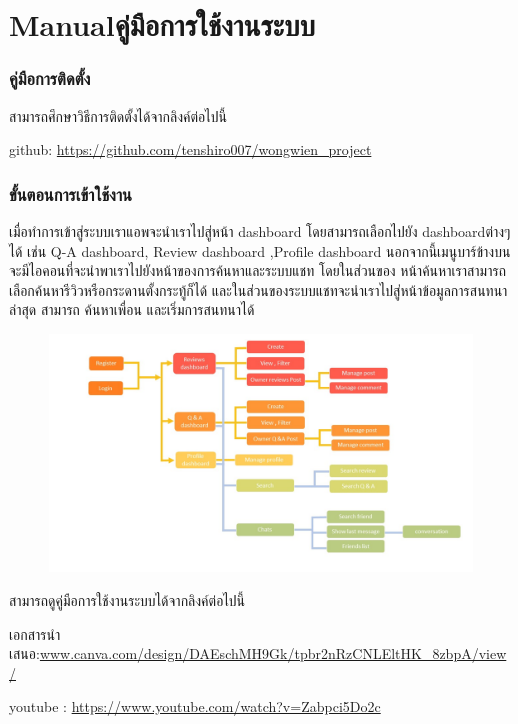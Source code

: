 
\ifenglish\else

\fi

\chapter{\ifenglish Manual\else คู่มือการใช้งานระบบ\fi}

\subsection{คู่มือการติดตั้ง }

สามารถศึกษาวิธีการติดตั้งได้จากลิงค์ต่อไปนี้

github: \href{https://github.com/tenshiro007/wongwien_project}{https://github.com/tenshiro007/wongwien\_project}

\subsection{ขั้นตอนการเข้าใช้งาน }

\quad \quad เมื่อทำการเข้าสู่ระบบเราแอพจะนำเราไปสู่หน้า dashboard โดยสามารถเลือกไปยัง dashboardต่างๆได้ เช่น Q-A dashboard, Review
dashboard ,Profile dashboard นอกจากนี้เมนูบาร์ข้างบนจะมีไอคอนที่จะนำพาเราไปยังหน้าของการค้นหาและระบบแชท โดยในส่วนของ
หน้าค้นหาเราสามารถเลือกค้นหารีวิวหรือกระดานตั้งกระทู้ก็ได้ และในส่วนของระบบแชทจะนำเราไปสู่หน้าข้อมูลการสนทนาล่าสุด สามารถ
ค้นหาเพื่อน และเริ่มการสนทนาได้
 \begin{figure}[h]
\begin{center}
  \includegraphics[width=1\textwidth]{./image/reviews/howtouse.JPG}
\end{center}  
\end{figure}

สามารถดูคู่มือการใช้งานระบบได้จากลิงค์ต่อไปนี้

เอกสารนำเสนอ:\href{www.canva.com/design/DAEschMH9Gk/tpbr2nRzCNLEltHK_8zbpA/view/}{www.canva.com/design/DAEschMH9Gk/tpbr2nRzCNLEltHK\_8zbpA/view/}

youtube : \href{https://www.youtube.com/watch?v=Zabpci5Do2c}{https://www.youtube.com/watch?v=Zabpci5Do2c}